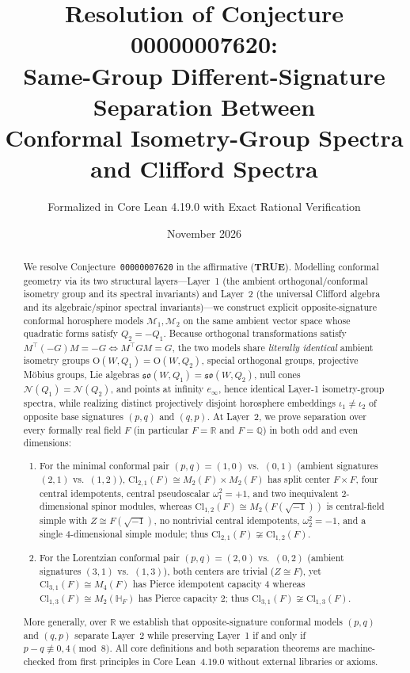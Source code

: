 \documentclass[11pt]{article}
\title{\textbf{Resolution of Conjecture 00000007620:\\
Same-Group Different-Signature Separation Between\\
Conformal Isometry-Group Spectra and Clifford Spectra}}
\author{Formalized in Core Lean 4.19.0 with Exact Rational Verification}
\date{November 2026}
\theoremstyle{definition}
\newcommand{\Cl}{\mathrm{Cl}}
\newcommand{\Orth}{\mathrm{O}}
\newcommand{\so}{\mathfrak{so}}
\begin{document}
\maketitle

\begin{abstract}
We resolve Conjecture~\texttt{00000007620} in the affirmative (\textbf{TRUE}). Modelling conformal geometry via its two structural layers---Layer~1 (the ambient orthogonal/conformal isometry group and its spectral invariants) and Layer~2 (the universal Clifford algebra and its algebraic/spinor spectral invariants)---we construct explicit opposite-signature conformal horosphere models $\mathcal{M}_1, \mathcal{M}_2$ on the same ambient vector space whose quadratic forms satisfy $Q_2 = -Q_1$. Because orthogonal transformations satisfy $M^\top (-G) M = -G \iff M^\top G M = G$, the two models share \emph{literally identical} ambient isometry groups $\Orth(W, Q_1) = \Orth(W, Q_2)$, special orthogonal groups, projective Möbius groups, Lie algebras $\so(W, Q_1) = \so(W, Q_2)$, null cones $\mathcal{N}(Q_1) = \mathcal{N}(Q_2)$, and points at infinity $e_\infty$, hence identical Layer-1 isometry-group spectra, while realizing distinct projectively disjoint horosphere embeddings $\iota_1 \neq \iota_2$ of opposite base signatures $(p, q)$ and $(q, p)$. At Layer~2, we prove separation over every formally real field $F$ (in particular $F = \mathbb{R}$ and $F = \mathbb{Q}$) in both odd and even dimensions:
\begin{enumerate}
  \item For the minimal conformal pair $(p, q) = (1, 0)$ vs.\ $(0, 1)$ (ambient signatures $(2, 1)$ vs.\ $(1, 2)$), $\Cl_{2,1}(F) \cong M_2(F) \times M_2(F)$ has split center $F \times F$, four central idempotents, central pseudoscalar $\omega_1^2 = +1$, and two inequivalent $2$-dimensional spinor modules, whereas $\Cl_{1,2}(F) \cong M_2(F(\sqrt{-1}))$ is central-field simple with $Z \cong F(\sqrt{-1})$, no nontrivial central idempotents, $\omega_2^2 = -1$, and a single $4$-dimensional simple module; thus $\Cl_{2,1}(F) \not\cong \Cl_{1,2}(F)$.
  \item For the Lorentzian conformal pair $(p, q) = (2, 0)$ vs.\ $(0, 2)$ (ambient signatures $(3, 1)$ vs.\ $(1, 3)$), both centers are trivial ($Z \cong F$), yet $\Cl_{3,1}(F) \cong M_4(F)$ has Pierce idempotent capacity $4$ whereas $\Cl_{1,3}(F) \cong M_2(\mathbb{H}_F)$ has Pierce capacity $2$; thus $\Cl_{3,1}(F) \not\cong \Cl_{1,3}(F)$.
\end{enumerate}
More generally, over $\mathbb{R}$ we establish that opposite-signature conformal models $(p, q)$ and $(q, p)$ separate Layer~2 while preserving Layer~1 if and only if $p - q \not\equiv 0, 4 \pmod{8}$. All core definitions and both separation theorems are machine-checked from first principles in Core Lean~4.19.0 without external libraries or axioms.
\end{abstract}
\end{document}
